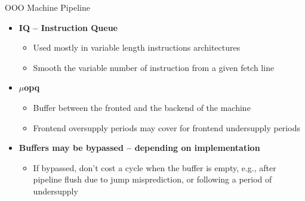 \documentclass[aspectratio=169,12pt]{beamer}
\begin{document}
\begin{frame}{OOO Machine Pipeline}
    \centering
    
    
    \begin{itemize}
    \item \textbf{IQ -- Instruction Queue}
    \begin{itemize}
        \item Used mostly in variable length instructions architectures
        \item Smooth the variable number of instruction from a given fetch line
    \end{itemize}
    
    \item \textbf{$\mu$opq}
    \begin{itemize}
        \item Buffer between the fronted and the backend of the machine
        \item Frontend oversupply periods may cover for frontend undersupply periods
    \end{itemize}
    
    \item \textbf{Buffers may be bypassed -- depending on implementation}
    \begin{itemize}
        \item If bypassed, don't cost a cycle when the buffer is empty, e.g., after pipeline flush due to jump misprediction, or following a period of undersupply
    \end{itemize}
  \end{itemize}
\end{frame}
\end{document}
